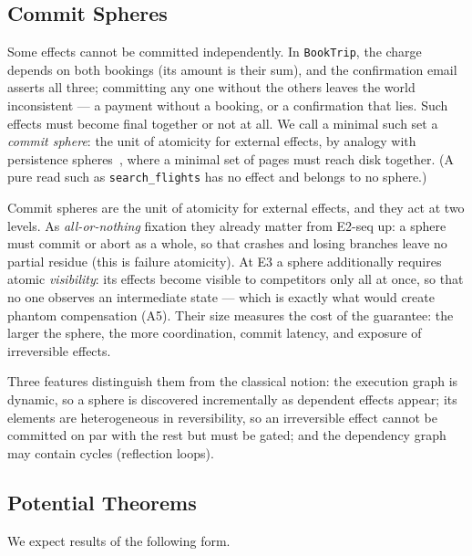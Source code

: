\documentclass[11pt]{article}
\begin{document}
\subsection{Commit Spheres}

Some effects cannot be committed independently. In \texttt{BookTrip}, the
charge depends on both bookings (its amount is their sum), and the
confirmation email asserts all three; committing any one without the
others leaves the world inconsistent --- a payment without a booking, or a
confirmation that lies. Such effects must become final together or not at
all. We call a minimal such set a \emph{commit sphere}: the unit of
atomicity for external effects, by analogy with persistence
spheres~\cite{weikum1991principles}, where a minimal set of pages must
reach disk together. (A pure read such as \texttt{search\_flights} has no
effect and belongs to no sphere.)

Commit spheres are the unit of atomicity for external effects, and they
act at two levels. As \emph{all-or-nothing} fixation they already matter
from E2-seq up: a sphere must commit or abort as a whole, so that crashes and
losing branches leave no partial residue (this is failure atomicity). At
E3 a sphere additionally requires atomic \emph{visibility}: its effects
become visible to competitors only all at once, so that no one observes an
intermediate state --- which is exactly what would create phantom
compensation (A5). Their size measures the cost of the guarantee: the
larger the sphere, the more coordination, commit latency, and exposure of
irreversible effects.

Three features distinguish them from the classical
notion: the execution graph is dynamic, so a sphere is discovered
incrementally as dependent effects appear; its elements are heterogeneous
in reversibility, so an irreversible effect cannot be committed on par with
the rest but must be gated; and the dependency graph may contain cycles
(reflection loops).

\subsection{Potential Theorems}

We expect results of the following form.
\end{document}
